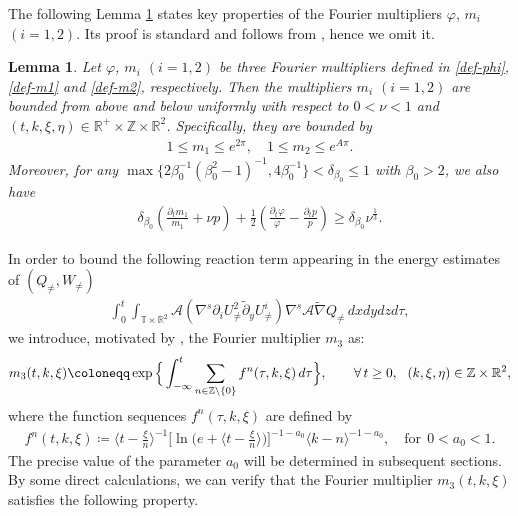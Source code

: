 \documentclass[11pt,reqno]{article}
\newtheorem{lemm}[theo]{Lemma}
\numberwithin{equation}{section}
\newcommand\R{{\mathbb R}}
\newcommand\T{{\mathbb T}}
\newcommand\Z{{\mathbb Z}}
\newcommand\A{\mathcal{A}}
\newcommand \tri {\coloneqq}
\let\pa=\partial
\let\f=\frac
\def\exp{\mathop{\rm exp}\nolimits}
\begin{document}
The following Lemma \ref{sec2:lem-1} states key properties of the Fourier multipliers $\varphi$, $m_i$ $(i=1,2)$.
Its proof is standard and follows from \cite{Bedrossian-Germain-Masmoudi-2017}, hence we omit it.
\begin{lemm}\label{sec2:lem-1}
Let $\varphi$, $m_i$ $(i=1,2)$ be three Fourier multipliers defined in \eqref{def-phi}, \eqref{def-m1}  and \eqref{def-m2}, respectively.
Then the multipliers $m_i$ $(i=1,2)$ are bounded from above and below uniformly with respect to $0<\nu<1$ and $(t,k,\xi,\eta)\in\R^+\times \Z\times\R^2$. 
Specifically, they are bounded by
\begin{align*}
	1\leq m_1\leq e^{2\pi}, \quad
	1\leq m_2\leq e^{A\pi}.
\end{align*}
Moreover, for any $\max\{2\beta_0^{-1}(\beta_0^2-1)^{-1},4\beta_0^{-1}\}<\delta_{\beta_0}\leq 1$ with $\beta_0>2$, we also have
\begin{align}\label{est-varphi-2}
		\delta_{\beta_0}\left(\f{\pa_{t} m_1}{m_1}+\nu p\right)+\f12\left(\f{\pa_{t}\varphi}{\varphi}-\f{\pa_{t} p}{p}\right)\geq \delta_{\beta_0} \nu^{\f13}. %
\end{align}
\end{lemm}


In order to bound the following reaction term appearing in the energy estimates of $(Q_{\neq}, W_{\neq})$
\begin{align*}
\int_0^t\int_{\T\times\R^2}
\A(\nabla^s\pa_{i}U_{\not=}^2\tilde{\pa}_yU_{\not=}^i)\nabla^s\A\widetilde{\nabla}Q_{\not=}\,dxdydzd\tau,
\end{align*}
 we introduce, motivated by \cite{Knobel-2025}, the Fourier multiplier $m_3$ as:
\begin{align}\label{def-m0}
m_{3}(t,k,\xi)\tri \exp\Big\{ \int_{-\infty}^{t}\sum_{n\in\Z\backslash\{0\}}f^{n}(\tau,k,\xi)\,d\tau \Big\}, \qquad  \forall \,t\geq0, ~~(k,\xi,\eta)\in\Z\times\R^2,
\end{align}
where the function sequences $f^{n}(\tau,k,\xi)$ are defined by
\begin{align*}
f^{n}(t,k,\xi)\tri \big\langle t-\f{\xi}{n}\big\rangle^{-1} \big[\ln\big(e+\big\langle t-\f{\xi}{n}\big\rangle\big)\big]^{-1-a_0}\langle k-n\rangle^{-1-a_0},\quad \text{for}~~0<a_0<1.
\end{align*}
The precise value of the parameter $a_0$ will be determined in subsequent sections.
By some direct calculations, we can verify that the Fourier multiplier $m_{3}(t,k,\xi)$ satisfies the following property.
\end{document}
